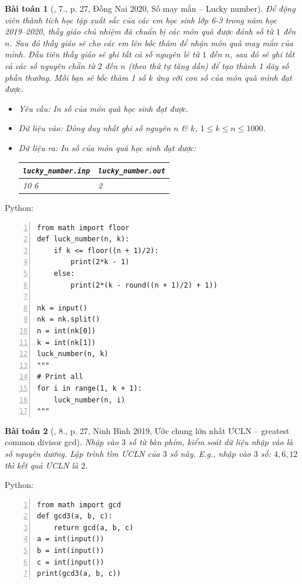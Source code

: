 \documentclass{article}
\newtheorem{baitoan}{Bài toán}
\begin{document}
\begin{baitoan}[\cite{VietSTEM2021}, 7., p. 27, Đồng Nai 2020, Số may mắn -- Lucky number]
	Để động viên thành tích học tập xuất sắc của các em học sinh lớp 6-3 trong năm học 2019--2020, thầy giáo chủ nhiệm đã chuẩn bị các món quà được đánh số từ $1$ đến $n$. Sau đó thầy giáo sẽ cho các em lên bốc thăm để nhận món quà may mắn của mình. Đầu tiên thầy giáo sẽ ghi tất cả số nguyên lẻ từ $1$ đến $n$, sau đó sẽ ghi tất cả các số nguyên chẵn từ $2$ đến $n$ (theo thứ tự tăng dần) để tạo thành 1 dãy số phần thưởng. Mỗi bạn sẽ bốc thăm 1 số $k$ ứng với con số của món quà mình đạt được.
	\begin{itemize}
		\item {\sf Yêu cầu:} In số của món quà học sinh đạt được.
		\item {\sf Dữ liệu vào:} Dòng duy nhất ghi số nguyên $n$ \& $k$, $1\le k\le n\le1000$.
		\item {\sf Dữ liệu ra:} In số của món quà học sinh đạt được:
		\begin{table}[H]
			\centering
			\begin{tabular}{|l|l|}
				\hline
				\verb|lucky_number.inp| & \verb|lucky_number.out| \\
				\hline
				10 6 & 2 \\
				\hline
			\end{tabular}
		\end{table}
	\end{itemize}
\end{baitoan}
Python:
\begin{Verbatim}[numbers=left,xleftmargin=5mm]
from math import floor
def luck_number(n, k):
    if k <= floor((n + 1)/2):
        print(2*k - 1)
    else:
        print(2*(k - round((n + 1)/2) + 1))

nk = input()
nk = nk.split()
n = int(nk[0])
k = int(nk[1])
luck_number(n, k)
"""
# Print all
for i in range(1, k + 1):
    luck_number(n, i)
"""
\end{Verbatim}

\begin{baitoan}[\cite{VietSTEM2021}, 8., p. 27, Ninh Bình 2019, Ước chung lớn nhất ƯCLN -- greatest common divisor gcd]
	Nhập vào $3$ số từ bàn phím, kiểm soát dữ liệu nhập vào là số nguyên dương. Lập trình tìm \emph{ƯCLN} của $3$ số này. E.g., nhập vào $3$ số: $4,6,12$ thì kết quả \emph{ƯCLN} là $2$.
\end{baitoan}
Python:
\begin{Verbatim}[numbers=left,xleftmargin=5mm]
from math import gcd
def gcd3(a, b, c):
    return gcd(a, b, c)
a = int(input())
b = int(input())
c = int(input())
print(gcd3(a, b, c))
\end{Verbatim}
\end{document}
